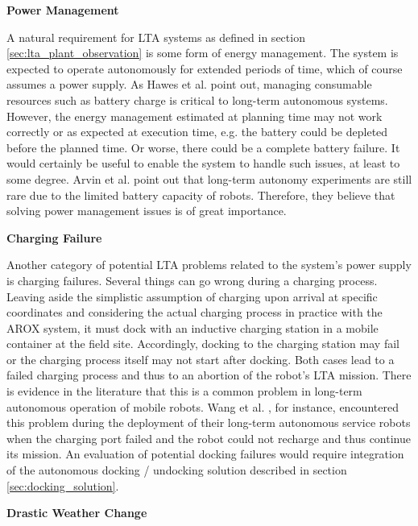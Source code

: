 \documentclass[english, master, utf8]{base/thesis_KBS}
\begin{document}
\noindent
\textbf{Power Management}\newline

\noindent
A natural requirement for LTA systems as defined in section \ref{sec:lta_plant_observation} is some form of energy management.
The system is expected to operate autonomously for extended periods of time, which of course assumes a power supply. 
As Hawes et al. \cite{Hawes:2017} point out, managing consumable resources such as battery charge is critical to long-term autonomous systems.
However, the energy management estimated at planning time may not work correctly or as expected at execution time, e.g. the battery could be 
depleted before the planned time. Or worse, there could be a complete battery failure. It would certainly be useful to enable the system to handle such issues, at least to 
some degree. Arvin et al. point out that long-term autonomy experiments are still rare due to the limited battery capacity of robots. \cite{Arvin:2018}
Therefore, they believe that solving power management issues is of great importance.\newline

\noindent
\textbf{Charging Failure}\newline

\noindent
Another category of potential LTA problems related to the system's power supply is charging failures. Several things can go wrong during a charging process. 
Leaving aside the simplistic assumption of charging upon arrival at specific coordinates and considering the actual charging process 
in practice with the AROX system, it must dock with an inductive charging station in a mobile container at the field site.
Accordingly, docking to the charging station may fail or the charging process itself may not start after docking.
Both cases lead to a failed charging process and thus to an abortion of the robot's LTA mission.
There is evidence in the literature that this is a common problem in long-term autonomous operation of mobile robots. Wang et al. \cite{Wang:2018}, for instance, encountered
this problem during the deployment of their long-term autonomous service robots when the charging port failed and the robot could not recharge and thus continue its mission.
An evaluation of potential docking failures would require integration of the autonomous docking / undocking solution described in section \ref{sec:docking_solution}.\newline

\noindent
\textbf{Drastic Weather Change}\newline
\end{document}
